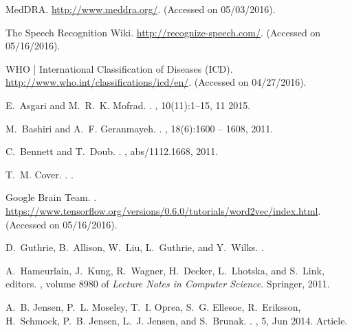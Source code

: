 \documentclass[11pt, final, journal, twoside, a4paper]{IEEEtran}
\begin{document}
%
\begin{thebibliography}{10}

{MedDRA}.
\newblock \url{http://www.meddra.org/}.
\newblock (Accessed on 05/03/2016).

{The Speech Recognition Wiki}.
\newblock \url{http://recognize-speech.com/}.
\newblock (Accessed on 05/16/2016).


{WHO | International Classification of Diseases (ICD)}.
\newblock \url{http://www.who.int/classifications/icd/en/}.
\newblock (Accessed on 04/27/2016).

E.~Asgari and M.~R.~K. Mofrad.
.
, 10(11):1--15, 11 2015.

M.~Bashiri and A.~F. Geranmayeh.
.
, 18(6):1600 -- 1608, 2011.

C.~Bennett and T.~Doub.
.
, abs/1112.1668, 2011.

T.~M. Cover.
.
.

{Google Brain Team}.
.
\newblock
  \url{https://www.tensorflow.org/versions/0.6.0/tutorials/word2vec/index.html}.
\newblock (Accessed on 05/16/2016).

D.~Guthrie, B.~Allison, W.~Liu, L.~Guthrie, and Y.~Wilks.
.

A.~Hameurlain, J.~Kung, R.~Wagner, H.~Decker, L.~Lhotska, and S.~Link, editors.
, volume 8980 of {\em Lecture Notes in Computer Science}.
  Springer, 2011.

A.~B. Jensen, P.~L. Moseley, T.~I. Oprea, S.~G. Ellesoe, R.~Eriksson,
  H.~Schmock, P.~B. Jensen, L.~J. Jensen, and S.~Brunak.
.
, 5, Jun 2014.
\newblock Article.


\end{thebibliography}
\end{document}
